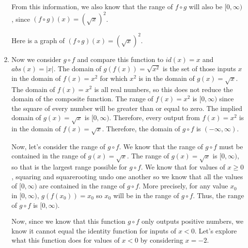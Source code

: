 \documentclass{ximera}
\begin{document}
\begin{example}
\begin{explanation}
\begin{enumerate}[label=\alph*.]
From this information, we also know that the range of $f \circ g$ will also be $[0,\infty)$, since $(f \circ g)(x) =  (\sqrt{x})^2$.

Here is a graph of $(f \circ g)(x) =  (\sqrt{x})^2$.

\begin{image}
\end{image}

\item Now we consider $g \circ f$ and compare this function to $id(x)=x$ and $abs(x)=|x|$.  The domain of $g(f(x))=\sqrt{x^2}$ is the set of those inputs $x$ in the domain of $f(x)=x^2$ for which $x^2$ is in the domain of $g(x)=\sqrt{x}$.  The domain of $f(x)=x^2$ is all real numbers, so this does not reduce the domain of the composite function.  The range of $f(x)=x^2$ is $[0,\infty)$ since the square of every number will be greater than or equal to zero.  The implied domain of $g(x)=\sqrt{x}$ is $[0,\infty)$.  Therefore, every output from $f(x)=x^2$ is in the domain of $f(x)=\sqrt{x}$.  Therefore, the domain of $g \circ f$ is  $(-\infty,\infty)$.

Now, let's consider the range of $g \circ f$.  We know that the range of $g \circ f$ must be contained in the range of $g(x)=\sqrt{x}$.  The range of $g(x)=\sqrt{x}$ is $[0,\infty)$, so that is the largest range possible for $g \circ f$.  We know that for values of $x \geq 0$, squaring and squarerooting undo one another so we know that all the values of $[0,\infty)$ are contained in the range of $g \circ f$.  More precisely, for any value $x_0$ in $[0,\infty)$, $g(f(x_0))=x_0$ so $x_0$ will be in the range of $g \circ f$.  Thus, the range of $g \circ f$ is $[0,\infty)$.

Now, since we know that this function $g \circ f$ only outputs positive numbers, we know it cannot equal the identity function for inputs of $x<0$.  Let's explore what this function does for values of $x<0$ by considering $x=-2$.


\end{enumerate}
\end{explanation}
\end{example}
\end{document}
